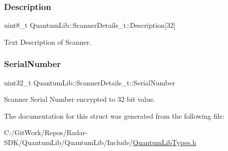 \subsubsection{\texorpdfstring{Description}{Description}}
{\footnotesize\ttfamily uint8\+\_\+t Quantum\+Lib\+::\+Scanner\+Details\+\_\+t\+::\+Description\mbox{[}32\mbox{]}}



Text Description of Scanner. 

\mbox{\label{struct_quantum_lib_1_1_scanner_details__t_a796ccbe4f3e77e5a2014bd515c06cde4}} 
\subsubsection{\texorpdfstring{Serial\+Number}{SerialNumber}}
{\footnotesize\ttfamily uint32\+\_\+t Quantum\+Lib\+::\+Scanner\+Details\+\_\+t\+::\+Serial\+Number}



Scanner Serial Number encrypted to 32 bit value. 



The documentation for this struct was generated from the following file\+:\begin{DoxyCompactItemize}
\item 
C\+:/\+Git\+Work/\+Repos/\+Radar-\/\+S\+D\+K/\+Quantum\+Lib/\+Quantum\+Lib/\+Include/\mbox{\hyperlink{_quantum_lib_types_8h}{Quantum\+Lib\+Types.\+h}}\end{DoxyCompactItemize}
